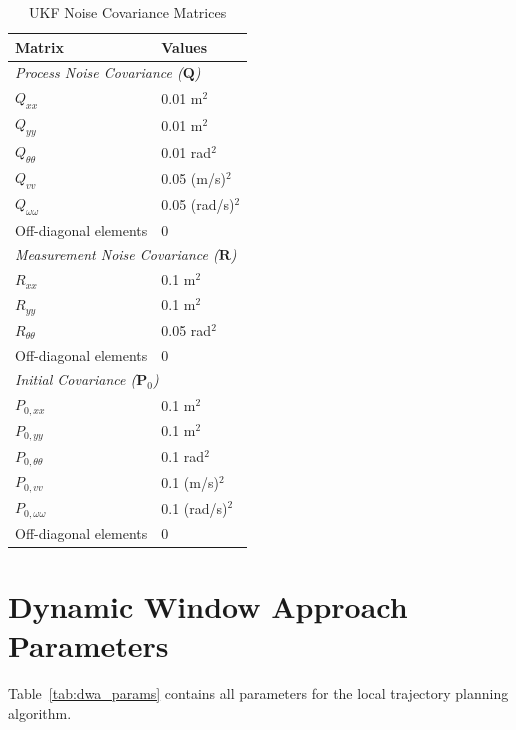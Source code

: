 \begin{table}[htbp]
\centering
\caption{UKF Noise Covariance Matrices}
\label{tab:ukf_matrices}
\begin{tabular}{@{}ll@{}}
\toprule
\textbf{Matrix} & \textbf{Values} \\
\midrule
\multicolumn{2}{l}{\textit{Process Noise Covariance ($\mathbf{Q}$)}} \\
$Q_{xx}$ & 0.01 m$^2$ \\
$Q_{yy}$ & 0.01 m$^2$ \\
$Q_{\theta\theta}$ & 0.01 rad$^2$ \\
$Q_{vv}$ & 0.05 (m/s)$^2$ \\
$Q_{\omega\omega}$ & 0.05 (rad/s)$^2$ \\
Off-diagonal elements & 0 \\
\midrule
\multicolumn{2}{l}{\textit{Measurement Noise Covariance ($\mathbf{R}$)}} \\
$R_{xx}$ & 0.1 m$^2$ \\
$R_{yy}$ & 0.1 m$^2$ \\
$R_{\theta\theta}$ & 0.05 rad$^2$ \\
Off-diagonal elements & 0 \\
\midrule
\multicolumn{2}{l}{\textit{Initial Covariance ($\mathbf{P}_0$)}} \\
$P_{0,xx}$ & 0.1 m$^2$ \\
$P_{0,yy}$ & 0.1 m$^2$ \\
$P_{0,\theta\theta}$ & 0.1 rad$^2$ \\
$P_{0,vv}$ & 0.1 (m/s)$^2$ \\
$P_{0,\omega\omega}$ & 0.1 (rad/s)$^2$ \\
Off-diagonal elements & 0 \\
\bottomrule
\end{tabular}
\end{table}

\clearpage

\section{Dynamic Window Approach Parameters}
\label{sec:dwa_params}

Table~\ref{tab:dwa_params} contains all parameters for the local trajectory planning algorithm.

